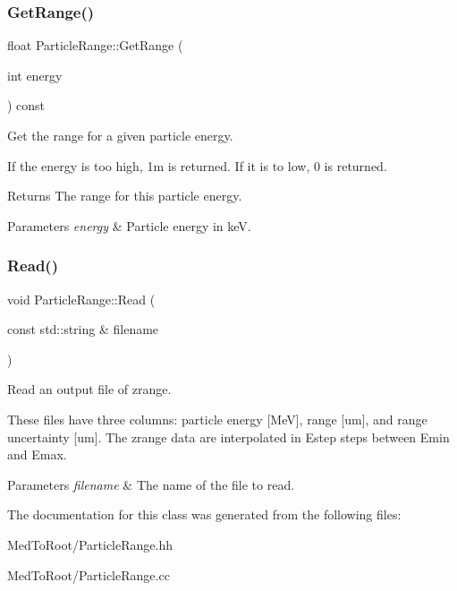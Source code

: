 \subsubsection{\texorpdfstring{Get\+Range()}{GetRange()}}
{\footnotesize\ttfamily float Particle\+Range\+::\+Get\+Range (\begin{DoxyParamCaption}\item[{int}]{energy }\end{DoxyParamCaption}) const}



Get the range for a given particle energy. 

If the energy is too high, 1m is returned. If it is to low, 0 is returned.

\begin{DoxyReturn}{Returns}
The range for this particle energy. 
\end{DoxyReturn}

\begin{DoxyParams}{Parameters}
{\em energy} & Particle energy in keV. \\
\hline
\end{DoxyParams}
\mbox{\label{class_particle_range_ac1e0da5aca629369e93caf8e883da624}} 
\subsubsection{\texorpdfstring{Read()}{Read()}}
{\footnotesize\ttfamily void Particle\+Range\+::\+Read (\begin{DoxyParamCaption}\item[{const std\+::string \&}]{filename }\end{DoxyParamCaption})}



Read an output file of zrange. 

These files have three columns\+: particle energy \mbox{[}MeV\mbox{]}, range \mbox{[}um\mbox{]}, and range uncertainty \mbox{[}um\mbox{]}. The zrange data are interpolated in Estep steps between Emin and Emax. 
\begin{DoxyParams}{Parameters}
{\em filename} & The name of the file to read. \\
\hline
\end{DoxyParams}


The documentation for this class was generated from the following files\+:\begin{DoxyCompactItemize}
\item 
Med\+To\+Root/Particle\+Range.\+hh\item 
Med\+To\+Root/Particle\+Range.\+cc\end{DoxyCompactItemize}
